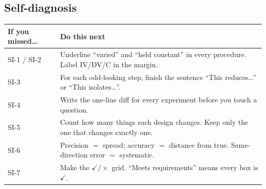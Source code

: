 \documentclass[11pt]{article}
\begin{document}
\vspace{2ex}
\subsection*{Self-diagnosis}
\small
\begin{tabularx}{\linewidth}{@{}l X@{}}
\toprule
If you missed\ldots & Do this next\\\midrule
SI-1 / SI-2 & Underline ``varied'' and ``held constant'' in every procedure. Label IV/DV/C in the margin.\\
SI-3 & For each odd-looking step, finish the sentence ``This reduces\ldots'' or ``This isolates\ldots''.\\
SI-4 & Write the one-line diff for every experiment before you touch a question.\\
SI-5 & Count how many things each design changes. Keep only the one that changes exactly one.\\
SI-6 & Precision $=$ spread; accuracy $=$ distance from true. Same-direction error $=$ systematic.\\
SI-7 & Make the $\checkmark/\times$ grid. ``Meets requirements'' means every box is $\checkmark$.\\
\bottomrule
\end{tabularx}

\makekey
\end{document}
